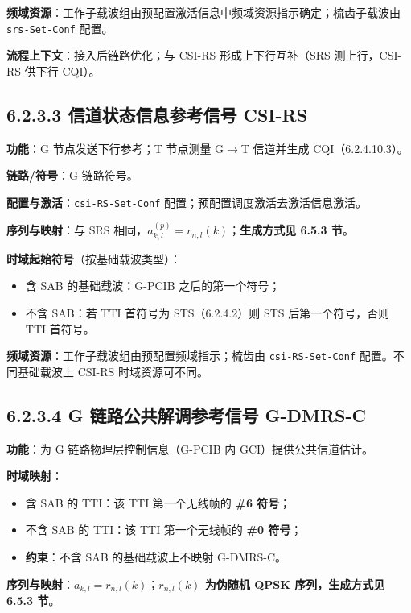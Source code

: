 \documentclass[11pt,a4paper]{ctexart}
\begin{document}
\textbf{频域资源}：工作子载波组由预配置激活信息中频域资源指示确定；梳齿子载波由 \texttt{srs-Set-Conf} 配置。

\textbf{流程上下文}：接入后链路优化；与 CSI-RS 形成上下行互补（SRS 测上行，CSI-RS 供下行 CQI）。

\subsection{6.2.3.3 信道状态信息参考信号 CSI-RS}

\textbf{功能}：G 节点发送下行参考；T 节点测量 G$\rightarrow$T 信道并生成 CQI（6.2.4.10.3）。

\textbf{链路/符号}：G 链路符号。

\textbf{配置与激活}：\texttt{csi-RS-Set-Conf} 配置；预配置调度激活去激活信息激活。

\textbf{序列与映射}：与 SRS 相同，$a_{k,l}^{(p)}=r_{n,l}(k)$；\textbf{生成方式见 6.5.3 节}。

\textbf{时域起始符号}（按基础载波类型）：
\begin{itemize}[nosep]
  \item 含 SAB 的基础载波：G-PCIB 之后的第一个符号；
  \item 不含 SAB：若 TTI 首符号为 STS（6.2.4.2）则 STS 后第一个符号，否则 TTI 首符号。
\end{itemize}

\textbf{频域资源}：工作子载波组由预配置频域指示；梳齿由 \texttt{csi-RS-Set-Conf} 配置。不同基础载波上 CSI-RS 时域资源可不同。

\subsection{6.2.3.4 G 链路公共解调参考信号 G-DMRS-C}

\textbf{功能}：为 G 链路物理层控制信息（G-PCIB 内 GCI）提供公共信道估计。

\textbf{时域映射}：
\begin{itemize}[nosep]
  \item 含 SAB 的 TTI：该 TTI 第一个无线帧的 \textbf{\#6 符号}；
  \item 不含 SAB 的 TTI：该 TTI 第一个无线帧的 \textbf{\#0 符号}；
  \item \textbf{约束}：不含 SAB 的基础载波上不映射 G-DMRS-C。
\end{itemize}

\textbf{序列与映射}：$a_{k,l}=r_{n,l}(k)$；\textbf{$r_{n,l}(k)$ 为伪随机 QPSK 序列，生成方式见 6.5.3 节}。
\end{document}
